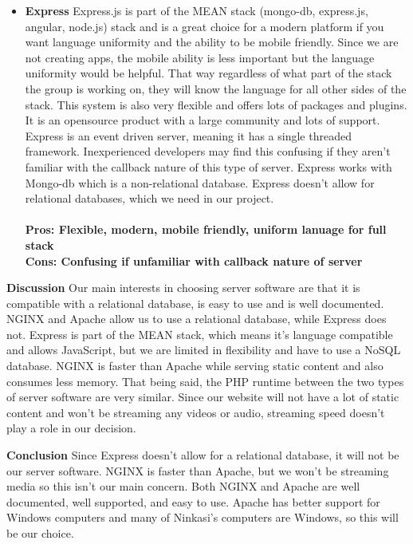 \documentclass[draftclsnofoot,onecolumn,letterpaper,10pt]{IEEEtran}
\begin{document}
\begin{itemize}
			\item{\textbf{Express}}
				Express.js is part of the MEAN stack (mongo-db, express.js, angular, node.js) stack and is a great choice for a modern platform if you want language uniformity and the ability to be mobile friendly\cite{UpWork}.
				Since we are not creating apps, the mobile ability is less important but the language uniformity would be helpful.
				That way regardless of what part of the stack the group is working on, they will know the language for all other sides of the stack.
				This system is also very flexible and offers lots of packages and plugins.
				It is an opensource product with a large community and lots of support\cite{JSSolutionsDev}.
				Express is an event  driven server, meaning it has a single threaded framework\cite{JSSolutionsDev}.
				Inexperienced developers may find this confusing if they aren't familiar with the callback nature of this type of server\cite{JSSolutionsDev}.
				Express works with Mongo-db which is a non-relational database. Express doesn’t allow for relational databases, which we need in our project.
				\\ \\
				\textbf{Pros: Flexible, modern, mobile friendly, uniform lanuage for full stack}
				\\
				\textbf{Cons: Confusing if unfamiliar with callback nature of server}

		\end{itemize}


		\textbf{Discussion}
		Our main interests in choosing server software are that it is compatible with a relational database, is easy to use and is well documented.
		NGINX and Apache allow us to use a relational database, while Express does not.
		Express is part of the MEAN stack, which means it’s language compatible and allows JavaScript, but we are limited in flexibility and have to use a NoSQL database.
		NGINX is faster than Apache while serving static content and also consumes less memory. That being said, the PHP runtime between the two types of server software are very similar\cite{HostingAd}.
		Since our website will not have a lot of static content and won’t be streaming any videos or audio, streaming speed doesn’t play a role in our decision.

		\textbf{Conclusion}
		Since Express doesn’t allow for a relational database, it will not be our server software.
		NGINX is faster than Apache, but we won’t be streaming media so this isn’t our main concern.
		Both NGINX and Apache are well documented, well supported, and easy to use.
		Apache has better support for Windows computers and many of Ninkasi’s computers are Windows, so this will be our choice.
\end{document}
